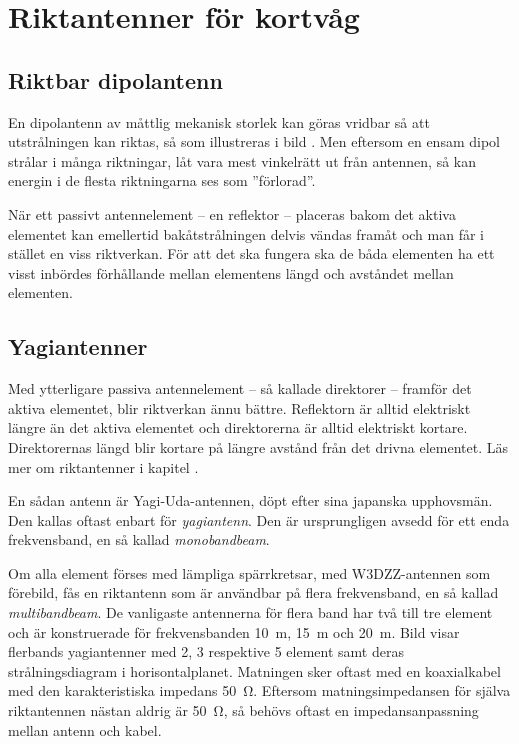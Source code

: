 \section{Riktantenner för kortvåg}

\subsection{Riktbar dipolantenn}


En dipolantenn av måttlig mekanisk storlek kan göras vridbar så att
utstrålningen kan riktas, så som illustreras i bild .
Men eftersom en ensam dipol strålar i många riktningar, låt vara mest vinkelrätt
ut från antennen, så kan energin i de flesta riktningarna ses som ''förlorad''.

När ett passivt antennelement -- en reflektor -- placeras bakom det aktiva
elementet kan emellertid bakåtstrålningen delvis vändas framåt och man får i
stället en viss riktverkan.
För att det ska fungera ska de båda elementen ha ett visst inbördes förhållande
mellan elementens längd och avståndet mellan elementen.


\subsection{Yagiantenner}


Med ytterligare passiva antennelement -- så kallade direktorer -- framför det
aktiva elementet, blir riktverkan ännu bättre.
Reflektorn är alltid elektriskt längre än det aktiva elementet och direktorerna
är alltid elektriskt kortare.
Direktorernas längd blir kortare på längre avstånd från det drivna elementet.
Läs mer om riktantenner i kapitel .

En sådan antenn är Yagi-Uda-antennen, döpt efter sina japanska upphovsmän.
Den kallas oftast enbart för \emph{yagiantenn}.
Den är ursprungligen avsedd för ett enda frekvensband, en så kallad
\emph{monobandbeam}.

Om alla element förses med lämpliga spärrkretsar, med W3DZZ-antennen som
förebild, fås en riktantenn som är användbar på flera frekvensband, en så
kallad \emph{multibandbeam}.
De vanligaste antennerna för flera band har två till tre element och är
konstruerade för frekvensbanden \qty{10}{\metre}, \qty{15}{\metre} och
\qty{20}{\metre}.
Bild  visar flerbands yagiantenner med 2, 3 respektive 5
element samt deras strålningsdiagram i horisontalplanet.
Matningen sker oftast med en koaxialkabel med den karakteristiska impedans
\qty{50}{\ohm}.
Eftersom matningsimpedansen för själva riktantennen nästan aldrig är
\qty{50}{\ohm}, så behövs oftast en impedansanpassning mellan antenn och kabel.


